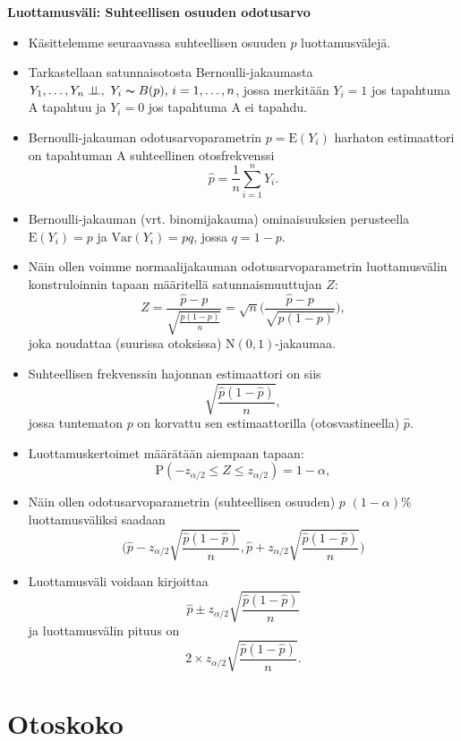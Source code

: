 \documentclass[
]{book}
\begin{document}
\hfill\break

\textbf{Luottamusväli: Suhteellisen osuuden odotusarvo}

\begin{itemize}
\item
  Käsittelemme seuraavassa suhteellisen osuuden \(p\) luottamusvälejä.
\item
  Tarkastellaan satunnaisotosta Bernoulli-jakaumasta
  \(Y_1, \ldots, Y_n \perp \!\!\! \perp, \,\, Y_i \thicksim B(p),\, i=1,\ldots,n\),
  jossa merkitään \(Y_i=1\) jos tapahtuma A tapahtuu ja \(Y_i=0\) jos tapahtuma A ei tapahdu.
\item
  Bernoulli-jakauman odotusarvoparametrin \(p=\text{E}(Y_i)\) harhaton estimaattori on tapahtuman A suhteellinen otosfrekvenssi
  \[
  \widehat{p} = \frac{1}{n} \sum_{i=1}^{n} Y_i.
  \]
\item
  Bernoulli-jakauman (vrt. binomijakauma) ominaisuuksien
  perusteella \(\text{E}(Y_i)=p\) ja \(\mathrm{Var}(Y_i)=pq\), jossa
  \(q=1-p\).
\item
  Näin ollen voimme normaalijakauman odotusarvoparametrin
  luottamusvälin konstruloinnin tapaan määritellä satunnaismuuttujan \(Z\):
  \[
  Z = \frac{\widehat{p} - p}{\sqrt{\frac{p (1-p)}{n}}} = 
  \sqrt{n} \Big(\frac{\widehat{p} - p}{\sqrt{p (1-p)}} \Big),  
  \]
  joka noudattaa (suurissa otoksissa) \(\text{N}(0,1)\)-jakaumaa.
\item
  Suhteellisen frekvenssin hajonnan estimaattori on siis
  \[
  \sqrt{\frac{\widehat{p} (1-\widehat{p})}{n}},
  \]
  jossa tuntematon \(p\) on korvattu sen estimaattorilla (otosvastineella) \(\widehat{p}\).
\item
  Luottamuskertoimet määrätään aiempaan tapaan:
  \[
  \text{P}(-z_{\alpha/2} \le Z \le z_{\alpha/2}) = 1-\alpha,
  \]
\item
  Näin ollen odotusarvoparametrin (suhteellisen osuuden) \(p\) \((1-\alpha)\)\% luottamusväliksi
  saadaan
  \[
  \Big(
  \widehat{p} - z_{\alpha/2} \sqrt{\frac{\widehat{p}(1-\widehat{p})}{n}},
  \widehat{p} + z_{\alpha/2} \sqrt{\frac{\widehat{p}(1-\widehat{p})}{n}} 
  \Big)
  \]
\item
  Luottamusväli voidaan kirjoittaa
  \[
  \widehat{p} \pm z_{\alpha/2} \sqrt{\frac{\widehat{p}(1-\widehat{p})}{n}}
  \]
  ja luottamusvälin pituus on
  \[
  2 \times z_{\alpha/2} \sqrt{\frac{\widehat{p}(1-\widehat{p})}{n}}.
  \]
\end{itemize}

\hypertarget{alaluku92}{%
\section{Otoskoko}\label{alaluku92}}
\end{document}
